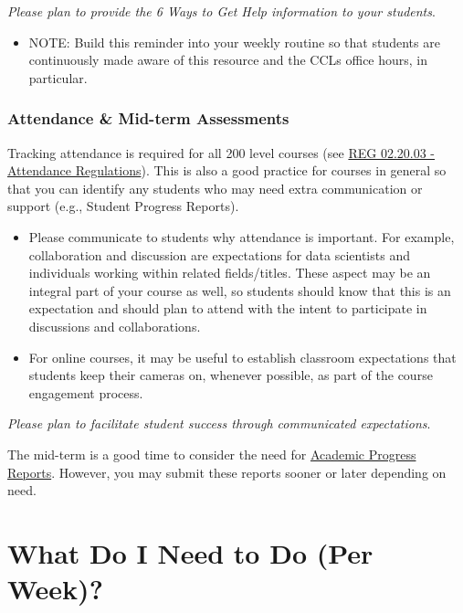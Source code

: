 \documentclass[
]{book}
\providecommand{\tightlist}{%
  \setlength{\itemsep}{0pt}\setlength{\parskip}{0pt}}
\begin{document}
{ \emph{Please plan to provide the 6 Ways to Get Help information to your students}. }

\begin{itemize}
\tightlist
\item
  NOTE: Build this reminder into your weekly routine so that students are continuously made aware of this resource and the CCLs office hours, in particular.
\end{itemize}

\hypertarget{attendance-mid-term-assessments}{%
\subsection{Attendance \& Mid-term Assessments}\label{attendance-mid-term-assessments}}

Tracking attendance is required for all 200 level courses (see \href{https://policies.ncsu.edu/regulation/reg-02-20-03-attendance-regulations/}{REG 02.20.03 - Attendance Regulations}). This is also a good practice for courses in general so that you can identify any students who may need extra communication or support (e.g., Student Progress Reports).

\begin{itemize}
\item
  Please communicate to students why attendance is important. For example, collaboration and discussion are expectations for data scientists and individuals working within related fields/titles. These aspect may be an integral part of your course as well, so students should know that this is an expectation and should plan to attend with the intent to participate in discussions and collaborations.
\item
  For online courses, it may be useful to establish classroom expectations that students keep their cameras on, whenever possible, as part of the course engagement process.
\end{itemize}

{ \emph{Please plan to facilitate student success through communicated expectations}. }

The mid-term is a good time to consider the need for \href{https://dasa.ncsu.edu/faculty-resources/academic-progress-reporting/}{Academic Progress Reports}. However, you may submit these reports sooner or later depending on need.

\hfill\break

\hypertarget{what-do-i-need-to-do-per-week}{%
\chapter{What Do I Need to Do (Per Week)?}\label{what-do-i-need-to-do-per-week}}
\end{document}
